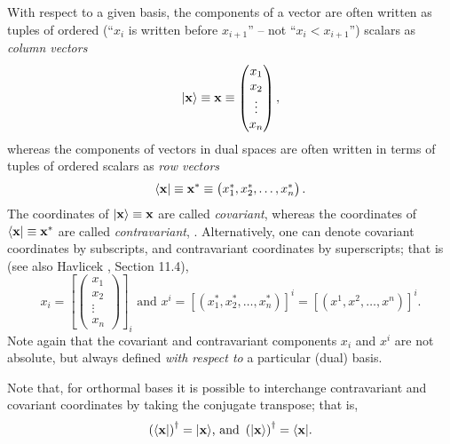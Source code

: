 With respect to a given basis,
the components of a vector are often written as tuples of ordered
(``$x_i$ is written before $x_{i+1}$'' -- not ``$x_i < x_{i+1}$'')
scalars  as {\em column vectors}
\begin{equation}
\vert {\bf x} \rangle
\equiv
{\bf x}
\equiv
\begin{pmatrix}
x_1\\x_2\\
\vdots \\
x_n
\end{pmatrix}
,
\end{equation}
whereas the components of vectors in dual spaces are often written in terms of
 tuples of ordered
scalars  as {\em row vectors}
\begin{equation}
\langle {\bf x} \vert
\equiv
{\bf x}^*\equiv
\begin{pmatrix}
x_1^*,x_2^*,\ldots , x_n^*
\end{pmatrix}
.
\end{equation}
The coordinates  of
$\vert {\bf x} \rangle
\equiv
{\bf x}
$
are called
{\em covariant},
whereas the coordinates of
$\langle {\bf x} \vert
\equiv
{\bf x}^*$
are called
{\em contravariant},
.
Alternatively, one can denote
covariant coordinates by subscripts,
and contravariant coordinates by superscripts; that is
(see also
Havlicek \cite{havlicek-laftm}, Section 11.4),
\begin{equation}
x_i =
\left[
\begin{pmatrix}
x_1\\
x_2\\
\vdots \\
x_n
\end{pmatrix}\right]_i
\textrm{ and }
 x^i =
\left[
(x_1^*,x_2^*,\ldots , x_n^* )\right]^i= \left[(x^1,x^2,\ldots , x^n )\right]^i .
\end{equation}
Note again that the covariant and contravariant components
$x_i$ and $x^i$ are not absolute, but always defined {\em with respect to}
a particular (dual) basis.

Note that, for orthormal bases it is possible to interchange contravariant and covariant coordinates by
taking the conjugate transpose; that is,
\begin{equation}
\left(\langle {\bf x} \vert \right)^\dagger = \vert {\bf x}  \rangle
\textrm {, and }
\left(\vert {\bf x}  \rangle \right)^\dagger = \langle {\bf x} \vert
.
\label{2015-m-ch-fdlvs-inter}
\end{equation}


